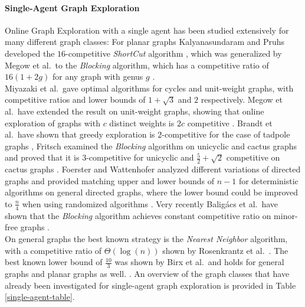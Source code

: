 \paragraph*{Single-Agent Graph Exploration} Online Graph Exploration with a single agent has been studied extensively for many different graph classes: For planar
graphs Kalyanasundaram and Pruhs developed the $16$-competitive \textit{ShortCut} algorithm \cite{Kalyanasundaram1993},
which was generalized by Megow et al.\ to the \textit{Blocking} algorithm, which has a competitive ratio of $16(1 + 2g)$ for
any graph with genus $g$ \cite{Megow2012}.\\
Miyazaki et al.\ gave optimal algorithms for cycles and unit-weight graphs, with competitive ratios and lower bounds of
$1+\sqrt{3}$ and $2$ respectively. Megow et al.\ have extended the result on unit-weight graphs, showing that online exploration of graphs with $c$ 
distinct weights is $2c$ competitive \cite{Megow2012}. Brandt et al.\ have shown that greedy exploration is $2$-competitive
for the case of tadpole graphs \cite{Brandt2020}, Fritsch examined the \textit{Blocking} algorithm on unicyclic and cactus graphs
and proved that it is $3$-competitive for unicyclic and $\frac{5}{2}+\sqrt{2}$ competitive on cactus graphs \cite{Fritsch2021}. 
Foerster and Wattenhofer analyzed different variations of directed graphs and provided matching upper and lower bounds of $n-1$ for 
deterministic algorithms on general directed graphs, where the lower bound could be improved to $\frac{n}{4}$ when using randomized
algorithms \cite{Foerster2016}. Very recently Baligács et al.\ have shown that the \textit{Blocking} algorithm achieves constant competitive
ratio on minor-free graphs \cite{Baligacs2023}.\\
On general graphs the best known strategy is the \textit{Nearest Neighbor} algorithm, with a competitive ratio of $\Theta(\log(n))$ shown by Rosenkrantz et al.\ \cite{Rosenkrantz1977}.
The best known lower bound of $\frac{10}{3}$ was shown by Birx et al.\ and holds for general graphs and planar graphs as well. \cite{Birx2020}. An overview of the graph classes that have
already been investigated for single-agent graph exploration is provided in Table \ref{single-agent-table}.

